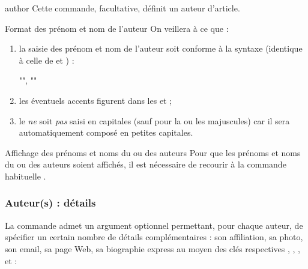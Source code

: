 \begin{docCommand}{author}{}
  Cette commande, facultative, définit un auteur d'article.
\end{docCommand}
%
\begin{dbwarning}{Format des prénom et nom de l'auteur}{}
  On veillera à ce que :
  \begin{enumerate}
  \item la saisie des prénom et nom de l'auteur soit conforme à la syntaxe
    (identique à celle de  et ) :
\begin{bodycode}[listing options={showspaces}]
"", ""
\end{bodycode}
  \item les éventuels accents figurent dans les  et
     ;
  \item le  \emph{ne} soit \emph{pas} saisi en capitales
    (sauf pour la ou les majuscules) car il sera automatiquement
    composé en petites capitales.
  \end{enumerate}
\end{dbwarning}

\begin{dbremark}{Affichage des prénoms et noms du ou des auteurs}{}
  Pour que les prénoms et noms du ou des auteurs soient affichés, il est
  nécessaire de recourir à la commande habituelle .
\end{dbremark}

\subsubsection{Auteur(s) : détails}
\label{sec-auteurs-details}

La commande  admet un argument optionnel permettant, pour chaque
auteur, de spécifier un certain nombre de détails complémentaires : son affiliation, sa
photo, son email, sa page Web, sa biographie express au moyen des clés
respectives %
, , ,  et
 :
\begin{bodycode}
\author[%
  affiliation="\marg{affiliation(s)}",%
  photo="\meta{photo}",%
  email="\meta{email}",%
  webpage="\meta{page Web}",%
  minibio="\marg{biographie express}"%
]{"", ""}
\end{bodycode}


